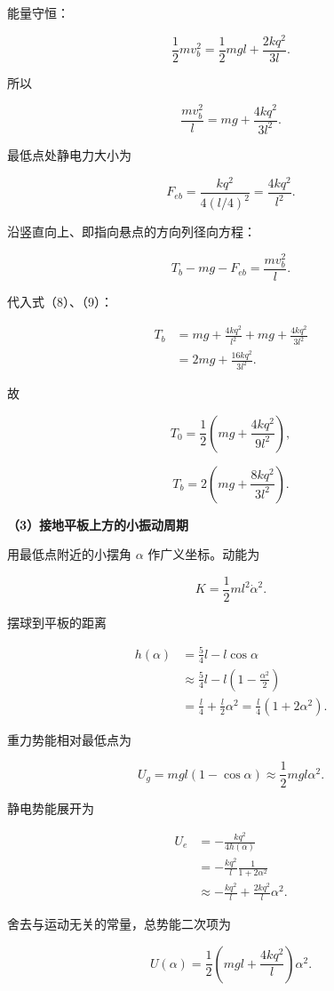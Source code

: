 \documentclass[12pt,a4paper,UTF8]{ctexart}
\begin{document}
能量守恒：

\[\frac12mv_b^2=\frac12mgl+\frac{2kq^2}{3l}. \tag{7}\]

所以

\[\frac{mv_b^2}{l}=mg+\frac{4kq^2}{3l^2}. \tag{8}\]

最低点处静电力大小为

\[F_{eb}=\frac{kq^2}{4(l/4)^2}=\frac{4kq^2}{l^2}. \tag{9}\]

沿竖直向上、即指向悬点的方向列径向方程：

\[T_b-mg-F_{eb}=\frac{mv_b^2}{l}.\]

代入式（8）、（9）：

\[\begin{aligned}
T_b
&=mg+\frac{4kq^2}{l^2}
+mg+\frac{4kq^2}{3l^2}\\
&=2mg+\frac{16kq^2}{3l^2}.
\end{aligned}\]

故

\[\boxed{T_0=\frac12\left(mg+\frac{4kq^2}{9l^2}\right)},\]

\[\boxed{T_b=2\left(mg+\frac{8kq^2}{3l^2}\right)}. \tag{10}\]

\textbf{（3）接地平板上方的小振动周期}

用最低点附近的小摆角 \(\alpha\) 作广义坐标。动能为

\[K=\frac12ml^2\dot\alpha^2. \tag{11}\]

摆球到平板的距离

\[\begin{aligned}
h(\alpha)
&=\frac54l-l\cos\alpha\\
&\approx\frac54l-l\left(1-\frac{\alpha^2}{2}\right)\\
&=\frac l4+\frac l2\alpha^2
=\frac l4(1+2\alpha^2).
\end{aligned} \tag{12}\]

重力势能相对最低点为

\[U_g=mgl(1-\cos\alpha)\approx\frac12mgl\alpha^2. \tag{13}\]

静电势能展开为

\[\begin{aligned}
U_e
&=-\frac{kq^2}{4h(\alpha)}\\
&=-\frac{kq^2}{l}\frac1{1+2\alpha^2}\\
&\approx-\frac{kq^2}{l}+\frac{2kq^2}{l}\alpha^2.
\end{aligned} \tag{14}\]

舍去与运动无关的常量，总势能二次项为

\[U(\alpha)=\frac12\left(mgl+\frac{4kq^2}{l}\right)\alpha^2. \tag{15}\]
\end{document}
